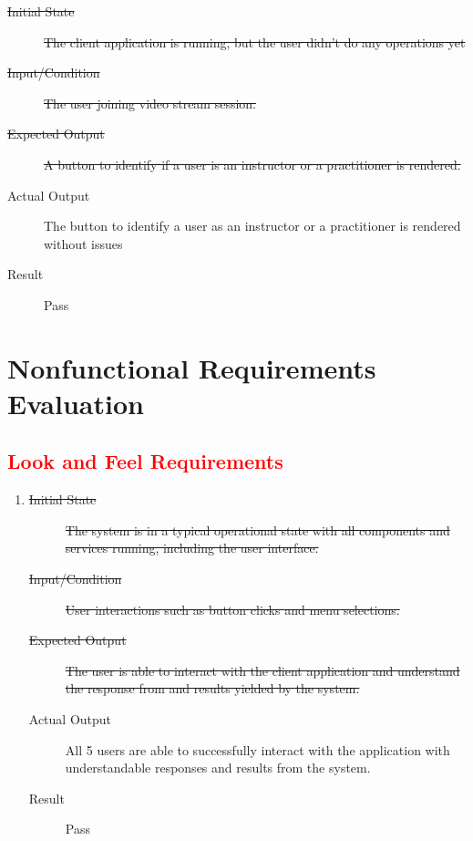\documentclass[12pt, titlepage]{article}
\newcommand{\rt}[1]{\textcolor{red}{#1}}
\begin{document}
\begin{enumerate}[FR-T1]
    \begin{description}
    \item[\sout{Initial State}]\sout{ The client application is running, but the user didn’t do
      any operations yet
    }
		\item[\sout{Input/Condition}]\sout{ The user joining video stream session.
    }
		\item[\sout{Expected Output}]\sout{ A button to identify if a user is an instructor or a
      practitioner is rendered.
    }
		\item[Actual Output] The button to identify a user as an instructor or a
      practitioner is rendered without issues
    \item[Result] Pass
    \end{description}
  \end{enumerate}

  \section{Nonfunctional Requirements Evaluation}

  \rt{\subsection{Look and Feel Requirements}}
  \begin{enumerate}[NFR-T1]
    \item \label{NFRT1}
      \begin{description}
      \item[\sout{Initial State}]\sout{ The system is in a typical operational state with all
        components and services running, including the user interface.
      }
      \item[\sout{Input/Condition}]\sout{ User interactions such as button clicks and menu
        selections.
      }
      \item[\sout{Expected Output}]\sout{ The user is able to interact with the client application
        and understand the response from and results yielded by the system.
      }
      \item[Actual Output] All 5 users are able to successfully interact with the
        application with understandable responses and results from the system.
      \item[Result] Pass
      \end{description}
  \end{enumerate}
  
\end{document}
